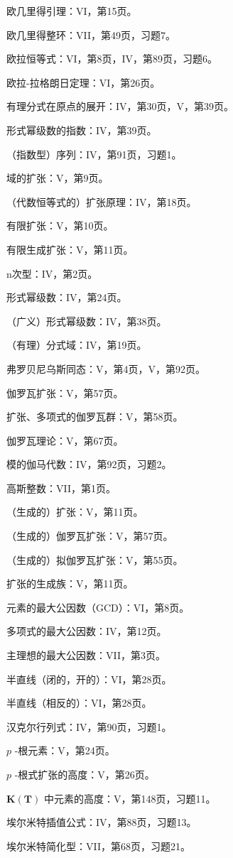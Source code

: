 欧几里得引理：VI，第15页。

欧几里得整环：VII，第49页，习题7。

欧拉恒等式：VI，第8页，IV，第89页，习题6。

欧拉-拉格朗日定理：VI，第26页。

有理分式在原点的展开：IV，第30页，V，第39页。

形式幂级数的指数：IV，第39页。

（指数型）序列：IV，第91页，习题1。

域的扩张：V，第9页。

（代数恒等式的）扩张原理：IV，第18页。

有限扩张：V，第10页。

有限生成扩张：V，第11页。

n次型：IV，第2页。

形式幂级数：IV，第24页。

（广义）形式幂级数：IV，第38页。

（有理）分式域：IV，第19页。

弗罗贝尼乌斯同态：V，第4页，V，第92页。

伽罗瓦扩张：V，第57页。

扩张、多项式的伽罗瓦群：V，第58页。

伽罗瓦理论：V，第67页。

模的伽马代数：IV，第92页，习题2。

高斯整数：VII，第1页。

（生成的）扩张：V，第11页。

（生成的）伽罗瓦扩张：V，第57页。

（生成的）拟伽罗瓦扩张：V，第55页。

扩张的生成族：V，第11页。

元素的最大公因数（GCD）：VI，第8页。

多项式的最大公因数：IV，第12页。

主理想的最大公因数：VII，第3页。

半直线（闭的，开的）：VI，第28页。

半直线（相反的）：VI，第28页。

汉克尔行列式：IV，第90页，习题1。

 \(p\) -根元素：V，第24页。

 \(p\) -根式扩张的高度：V，第26页。

 \(\mathbf{K}(\mathbf{T})\) 中元素的高度：V，第148页，习题11。

埃尔米特插值公式：IV，第88页，习题13。

埃尔米特简化型：VII，第68页，习题21。

